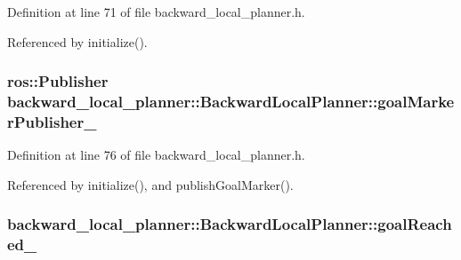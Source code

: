 Definition at line 71 of file backward\+\_\+local\+\_\+planner.\+h.



Referenced by initialize().

\subsubsection[{\texorpdfstring{goal\+Marker\+Publisher\+\_\+}{goalMarkerPublisher_}}]{\setlength{\rightskip}{0pt plus 5cm}ros\+::\+Publisher backward\+\_\+local\+\_\+planner\+::\+Backward\+Local\+Planner\+::goal\+Marker\+Publisher\+\_\+\hspace{0.3cm}{\ttfamily [private]}}\hypertarget{classbackward__local__planner_1_1BackwardLocalPlanner_aec215b9441f9ac359ea6a531339ac4f8}{}\label{classbackward__local__planner_1_1BackwardLocalPlanner_aec215b9441f9ac359ea6a531339ac4f8}


Definition at line 76 of file backward\+\_\+local\+\_\+planner.\+h.



Referenced by initialize(), and publish\+Goal\+Marker().

\subsubsection[{\texorpdfstring{goal\+Reached\+\_\+}{goalReached_}}]{ backward\+\_\+local\+\_\+planner\+::\+Backward\+Local\+Planner\+::goal\+Reached\+\_\+\hspace{0.3cm}{\ttfamily [private]}}\hypertarget{classbackward__local__planner_1_1BackwardLocalPlanner_a42fdfaf0d3eb1edb71a225ec7caf62d0}{}\label{classbackward__local__planner_1_1BackwardLocalPlanner_a42fdfaf0d3eb1edb71a225ec7caf62d0}


